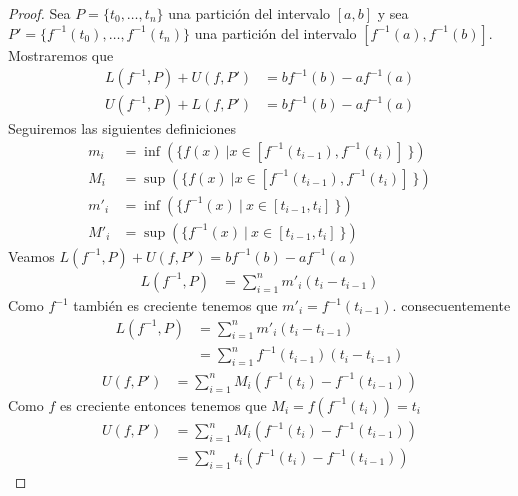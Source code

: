 \documentclass[a4paper]{article}
\begin{document}
\begin{proof}
    Sea \(P = \{t_{0}, \dotsc, t_{n}\}\) una partición del intervalo \([a, b]\) y sea 
\(P' = \{f^{-1}(t_{0}), \dotsc, f^{-1}(t_{n})\}\) una partición del intervalo \([f^{-1}\left(a\right), 
f^{-1}\left(b\right)]\). Mostraremos que 
\begin{align*}
    L\left(f^{-1}, P\right) + U\left(f, P'\right) &= bf^{-1}\left(b\right) - af^{-1}\left(a\right) \\
    U\left(f^{-1}, P\right) + L\left(f, P'\right) &= bf^{-1}\left(b\right) - af^{-1}\left(a\right)
\end{align*}
Seguiremos las siguientes definiciones
\begin{align*}
    m_{i} &= \inf{\left(\{f(x) \ | x \in [f^{-1}\left(t_{i - 1}\right), f^{-1}\left(t_{i}\right)] \ \}\right)} \\
    M_{i} &= \sup{\left(\{f(x) \ | x \in [f^{-1}\left(t_{i - 1}\right), f^{-1}\left(t_{i}\right)] \ \}\right)} \\
    m'_{i} &= \inf{\left(\{f^{-1}(x) \ | \ x \in [t_{i - 1}, t_{i}] \ \}\right)} \\
    M'_{i} &= \sup{\left(\{f^{-1}(x) \ | \ x \in [t_{i - 1}, t_{i}] \ \}\right)}
\end{align*}
Veamos \(L\left(f^{-1}, P\right) + U\left(f, P'\right) = bf^{-1}\left(b\right) - af^{-1}\left(a\right)\)
\newline 
\begin{align*}
    L\left(f^{-1}, P\right) &= \sum_{i = 1}^{n} m'_{i}(t_{i} - t_{i - 1})
\end{align*}
Como \(f^{-1}\) también es creciente tenemos que \(m'_{i} = f^{-1}\left(t_{i - 1}\right)\). 
consecuentemente
\begin{align*}
    L\left(f^{-1}, P\right) &= \sum_{i = 1}^{n} m'_{i}(t_{i} - t_{i - 1}) \\
                            &= \sum_{i = 1}^{n} f^{-1}\left(t_{i - 1}\right)(t_{i} - t_{i - 1})
\end{align*}
\begin{align*}
    U\left(f, P'\right) &= \sum_{i = 1}^{n} M_{i}(f^{-1}\left(t_{i}\right) - f^{-1}\left(t_{i - 1}\right))
\end{align*}
Como \(f\) es creciente entonces tenemos que \(M_{i} = f\left(f^{-1}\left(t_{i}\right)\right) = t_{i}\)
\begin{align*}
    U\left(f, P'\right) &= \sum_{i = 1}^{n} M_{i}(f^{-1}\left(t_{i}\right) - f^{-1}\left(t_{i - 1}\right)) \\
                        &= \sum_{i = 1}^{n} t_{i}(f^{-1}\left(t_{i}\right) - f^{-1}\left(t_{i - 1}\right))

\end{align*}
\end{proof}
\end{document}

